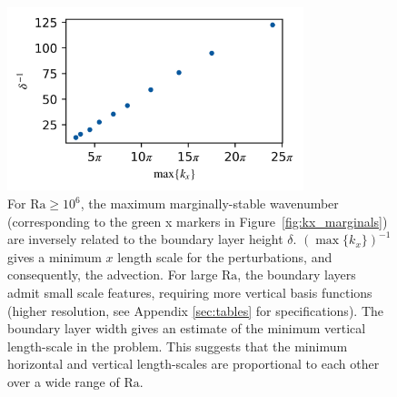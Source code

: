 \documentclass[reprint,amsmath,amssymb,aps,nofootinbib]{revtex4-1}
\newcommand\Ra{\mathrm{Ra}}
\begin{document}
\begin{figure}
    \centering
    \includegraphics[width=3.4in]{del_kx_inv.png}
    \caption{For $\Ra \geq 10^6$, the maximum marginally-stable wavenumber (corresponding to the green x markers in Figure~\ref{fig:kx_marginals}) are inversely related to the boundary layer height $\delta$. 
    $(\max \{ k_x \})^{-1}$ gives a minimum $x$ length scale for the perturbations, and consequently, the advection. 
    For large $\Ra$, the boundary layers admit small scale features, requiring more vertical basis functions (higher resolution, see Appendix \ref{sec:tables} for specifications).
    The boundary layer width gives an estimate of the minimum vertical length-scale in the problem.
    This suggests that the minimum horizontal and vertical length-scales are proportional to each other over a wide range of $\Ra$.}
    \label{fig:del_inv}
\end{figure}
\end{document}
